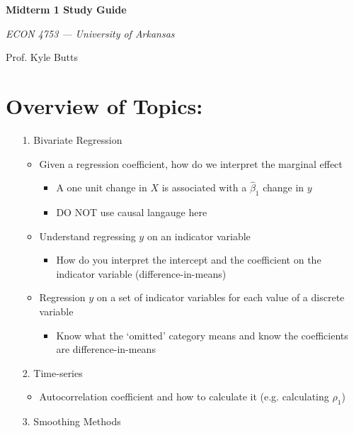 \documentclass[12pt]{article}
\begin{document}
\begin{center}
  {\Huge\bf Midterm 1 Study Guide}
  
  \smallskip
  {\large\it  ECON 4753 — University of Arkansas}

  \medskip
  {\large Prof. Kyle Butts}
\end{center}

\section*{Overview of Topics:}
\begin{enumerate}
  
  \item[1.] Bivariate Regression
  \begin{itemize}    
    \item Given a regression coefficient, how do we interpret the marginal effect
    \begin{itemize}
      \item A one unit change in $X$ is associated with a $\hat{\beta}_1$ change in $y$
      \item DO NOT use causal langauge here
    \end{itemize}

    \item Understand regressing $y$ on an indicator variable
    \begin{itemize}
      \item How do you interpret the intercept and the coefficient on the indicator variable (difference-in-means)
    \end{itemize}

    \item Regression $y$ on a set of indicator variables for each value of a discrete variable
    \begin{itemize}
      \item Know what the `omitted' category means and know the coefficients are difference-in-means
    \end{itemize}
  \end{itemize}
  
  \item[2.] Time-series
  \begin{itemize}
    \item Autocorrelation coefficient and how to calculate it (e.g. calculating $\rho_1$)
  \end{itemize}

  \item[3.] Smoothing Methods
  

\end{enumerate}
\end{document}
